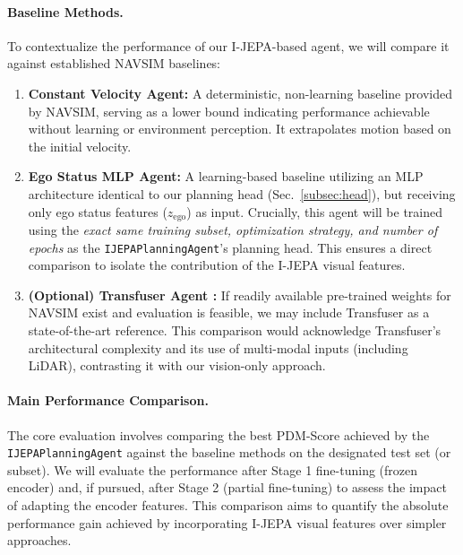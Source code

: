 \documentclass{article}
\begin{document}
\paragraph{Baseline Methods.}
To contextualize the performance of our I-JEPA-based agent, we will compare it against established NAVSIM baselines:
\begin{enumerate}
    \item \textbf{Constant Velocity Agent:} A deterministic, non-learning baseline provided by NAVSIM, serving as a lower bound indicating performance achievable without learning or environment perception. It extrapolates motion based on the initial velocity.
    \item \textbf{Ego Status MLP Agent:} A learning-based baseline utilizing an MLP architecture identical to our planning head (Sec.~\ref{subsec:head}), but receiving only ego status features ($z_{\text{ego}}$) as input. Crucially, this agent will be trained using the \textit{exact same training subset, optimization strategy, and number of epochs} as the \texttt{IJEPAPlanningAgent}'s planning head. This ensures a direct comparison to isolate the contribution of the I-JEPA visual features.
    \item \textbf{(Optional) Transfuser Agent \cite{chitta2023transfuser}:} If readily available pre-trained weights for NAVSIM exist and evaluation is feasible, we may include Transfuser as a state-of-the-art reference. This comparison would acknowledge Transfuser's architectural complexity and its use of multi-modal inputs (including LiDAR), contrasting it with our vision-only approach.
\end{enumerate}

\paragraph{Main Performance Comparison.}
The core evaluation involves comparing the best PDM-Score achieved by the \texttt{IJEPAPlanningAgent} against the baseline methods on the designated test set (or subset). We will evaluate the performance after Stage 1 fine-tuning (frozen encoder) and, if pursued, after Stage 2 (partial fine-tuning) to assess the impact of adapting the encoder features. This comparison aims to quantify the absolute performance gain achieved by incorporating I-JEPA visual features over simpler approaches.
\end{document}
